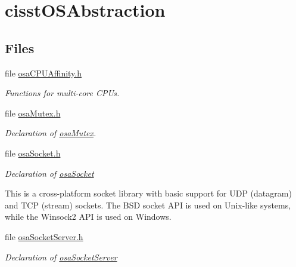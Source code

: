 \hypertarget{group__cisst_o_s_abstraction}{}\section{cisst\+O\+S\+Abstraction}
\label{group__cisst_o_s_abstraction}
\subsection*{Files}
\begin{DoxyCompactItemize}
\item 
file \hyperlink{osa_c_p_u_affinity_8h}{osa\+C\+P\+U\+Affinity.\+h}
\begin{DoxyCompactList}\small\item\em Functions for multi-\/core C\+P\+Us. \end{DoxyCompactList}\item 
file \hyperlink{osa_mutex_8h}{osa\+Mutex.\+h}
\begin{DoxyCompactList}\small\item\em Declaration of \hyperlink{classosa_mutex}{osa\+Mutex}. \end{DoxyCompactList}\item 
file \hyperlink{osa_socket_8h}{osa\+Socket.\+h}
\begin{DoxyCompactList}\small\item\em Declaration of \hyperlink{classosa_socket}{osa\+Socket}

This is a cross-\/platform socket library with basic support for U\+D\+P (datagram) and T\+C\+P (stream) sockets. The B\+S\+D socket A\+P\+I is used on Unix-\/like systems, while the Winsock2 A\+P\+I is used on Windows. \end{DoxyCompactList}\item 
file \hyperlink{osa_socket_server_8h}{osa\+Socket\+Server.\+h}
\begin{DoxyCompactList}\small\item\em Declaration of \hyperlink{classosa_socket_server}{osa\+Socket\+Server}


\end{DoxyCompactList}
\end{DoxyCompactItemize}
